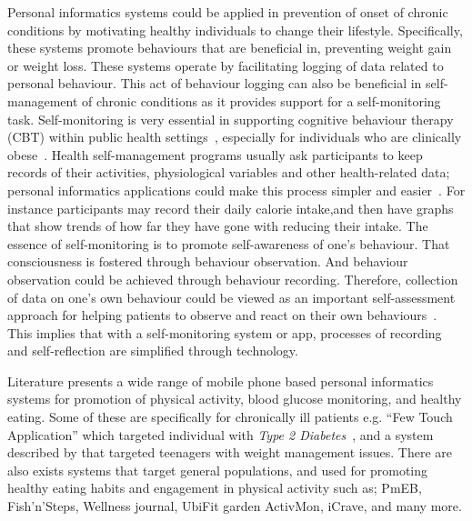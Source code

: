 Personal informatics systems could be applied in prevention of onset of chronic conditions by motivating healthy individuals to change their lifestyle. Specifically, these systems promote behaviours that are beneficial in, preventing weight gain or weight loss. These systems operate by facilitating logging of data related to personal behaviour. This act of behaviour logging can also be beneficial in self-management of chronic conditions as it provides support for a self-monitoring task. Self-monitoring is very essential in supporting cognitive behaviour therapy (CBT) within public health settings~\citep{mattila2008mobile}, especially for individuals who are clinically obese~\citep{nih2000practical}. Health self-management programs usually ask participants to keep records of their activities, physiological variables and other health-related data; personal informatics applications could make this process simpler and easier~\citep{medynskiy2010salud}. For instance participants may record their daily calorie intake,and then have graphs that show trends of how far they have gone with reducing their intake. The essence of self-monitoring is to promote self-awareness of one’s behaviour. That consciousness is fostered through behaviour observation. And behaviour observation could be achieved through behaviour recording. Therefore, collection of data on one's own behaviour could be viewed as an important self-assessment approach for helping patients to observe and react on their own behaviours~\citep{rapp2014meaningful}. This implies that with a self-monitoring system or app, processes of recording and self-reflection are simplified through technology. 

Literature presents a wide range of mobile phone based personal informatics systems for promotion of physical activity, blood glucose monitoring, and healthy eating. Some of these are specifically for chronically ill patients e.g. ``Few Touch Application'' which targeted individual with  \emph{Type 2 Diabetes}~\citep{arsand:mobile}, and a system described by \cite{arteaga2010:persuasive} that targeted teenagers with weight management issues. There are also exists systems that target general populations, and used for promoting healthy eating habits and engagement in physical activity  such as; PmEB\citep{lee2006pmeb}, Fish'n'Steps\citep{lin2006:fish}, Wellness journal\citep{mattila2008mobile}, UbiFit garden\citep{consolvo2008activity,klasnja2009:using} ActivMon\citep{burns2012using}, iCrave\citep{hsu2014persuasive}, and many more. 

